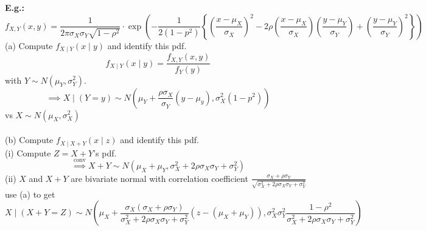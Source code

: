 \documentclass[a4paper]{article}
\newcommand{\n}{\hfill\break}
\newcommand{\eg}[1]{\par\noindent\settowidth{\hangindent}{\textbf{E.g.: }}\textbf{E.g.: }#1\n}
\begin{document}
\eg{
    \[f_{X,Y}(x,y)=\frac{1}{2\pi\sigma_X\sigma_Y\sqrt{1-\rho^2}}\cdot\exp{\left(-\frac{1}{2(1-p^2)}\left\{\left(\frac{x-\mu_X}{\sigma_X}\right)^2-2\rho\left(\frac{x-\mu_X}{\sigma_X}\right)\left(\frac{y-\mu_Y}{\sigma_Y}\right)+\left(\frac{y-\mu_Y}{\sigma_Y}\right)^2\right\}\right)}\]
    (a) Compute $f_{X\mid Y}(x\mid y)$ and identify this pdf.
    \[f_{X\mid Y}(x\mid y)=\frac{f_{X,Y}(x,y)}{f_Y(y)}\]
    with $Y\sim N(\mu_Y, \sigma^2_Y)$.
    \[\implies X\mid(Y=y)\sim N\left(\mu_Y+\frac{\rho\sigma_X}{\sigma_Y}(y-\mu_y),\sigma^2_X(1-p^2)\right)\]
    vs $X\sim N(\mu_X, \sigma_X^2)$
    \\\\
    (b) Compute $f_{X\mid X+Y}(x\mid z)$ and identify this pdf.\\
    (i) Compute $Z=X+Y$'s pdf.
    \[\overset{\text{conv}}{\implies}X+Y\sim N(\mu_X+\mu_Y, \sigma_X^2+2\rho\sigma_X\sigma_Y+\sigma_Y^2)\]
    (ii) $X$ and $X+Y$ are bivariate normal with correlation coefficient $\frac{\sigma_X+\rho\sigma_Y}{\sqrt{\sigma_X^2+2\rho\sigma_X\sigma_Y+\sigma_Y^2}}$ \\
    use (a) to get
    \[X\mid(X+Y=Z)\sim N\left(\mu_X+\frac{\sigma_X(\sigma_X+\rho\sigma_Y)}{\sigma_X^2+2\rho\sigma_X\sigma_Y+\sigma_Y^2}(z-(\mu_X+\mu_Y)), \sigma_X^2\sigma_Y^2\frac{1-\rho^2}{\sigma_X^2+2\rho\sigma_X\sigma_Y+\sigma_Y^2}\right)\]
    
}
\end{document}
